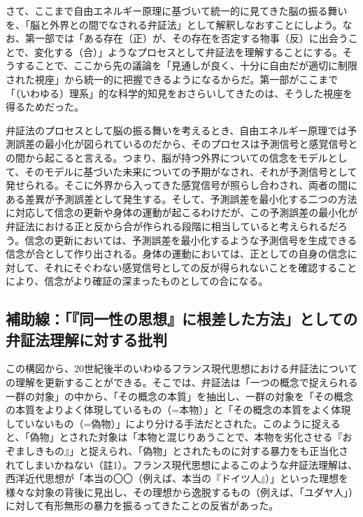 さて、ここまで\mbox{自由エネルギー原理}に基づいて統一的に見てきた脳の振る舞いを、「脳と外界との間でなされる\mbox{弁証法}」として解釈しなおすことにしよう。なお、第一部では「ある存在（正）が、その存在を否定する物事（反）に出会うことで、変化する（合）」ようなプロセスとして\mbox{弁証法}を理解することにする。そうすることで、ここから先の議論を「見通しが良く、十分に自由だが適切に制限された視座」から統一的に把握できるようになるからだ。第一部がここまで「（いわゆる）理系」的な科学的知見をおさらいしてきたのは、そうした視座を得るためだった。

\mbox{弁証法}のプロセスとして脳の振る舞いを考えるとき、\mbox{自由エネルギー原理}では\mbox{予測誤差}の最小化が図られているのだから、そのプロセスは予測信号と感覚信号との間から起こると言える。つまり、脳が持つ外界についての信念をモデルとして、そのモデルに基づいた未来についての予期がなされ、それが予測信号として発せられる。そこに外界から入ってきた感覚信号が照らし合わされ、両者の間にある差異が\mbox{予測誤差}として発生する。そして、\mbox{予測誤差}を最小化する二つの方法に対応して信念の更新や身体の運動が起こるわけだが、この\mbox{予測誤差}の最小化が\mbox{弁証法}における正と反から合が作られる段階に相当していると考えられるだろう。信念の更新においては、\mbox{予測誤差}を最小化するような予測信号を生成できる信念が合として作り出される。身体の運動においては、正としての自身の信念に対して、それにそぐわない感覚信号としての反が得られないことを確認することにより、信念がより確証の深まったものとしての合になる。

\subsection{補助線：「『同一性の思想』に根差した方法」としての弁証法理解に対する批判}\label{ux88dcux52a9ux7ddaux540cux4e00ux6027ux306eux601dux60f3ux306bux6839ux5deeux3057ux305fux65b9ux6cd5ux3068ux3057ux3066ux306eux5f01ux8a3cux6cd5ux7406ux89e3ux306bux5bfeux3059ux308bux6279ux5224}

この構図から、20世紀後半のいわゆるフランス現代思想における\mbox{弁証法}についての理解を更新することができる。そこでは、\mbox{弁証法}は「一つの概念で捉えられる一群の対象」の中から、「その概念の本質」を抽出し、一群の対象を「その概念の本質をよりよく体現しているもの（=本物）」と「その概念の本質をよく体現していないもの（=偽物）」により分ける手法だとされた。このように捉えると、「偽物」とされた対象は「本物と混じりあうことで、本物を劣化させる『おぞましきもの』」と捉えられ、「偽物」とされたものに対する暴力をも正当化されてしまいかねない（註1）。フランス現代思想によるこのような\mbox{弁証法}理解は、西洋近代思想が「本当の〇〇（例えば、本当の『ドイツ人』）」といった理想を様々な対象の背後に見出し、その理想から逸脱するもの（例えば、「ユダヤ人」）に対して有形無形の暴力を振るってきたことの反省があった。

